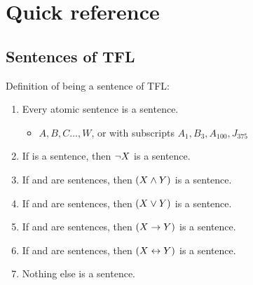 \chapter{Quick reference}\label{appendix:quickref}
\section{Sentences of TFL}
Definition of being a sentence of TFL:
	\begin{enumerate}
		\item Every atomic sentence is a sentence.
		\begin{itemize}
		\item $A,B,C\ldots,W$, or with subscripts $A_1, B_3, A_{100}, J_{375}$
		\end{itemize}
		\item If \metaX is a sentence, then $\neg X$ is a sentence.
		\item If \metaX and \metaY are sentences, then $(X\mathbin{\wedge}Y)$ is a sentence.
		\item If \metaX and \metaY are sentences, then $(X\vee Y)$ is a sentence.
		\item If \metaX and \metaY are sentences, then $(X\rightarrow Y)$ is a sentence.
		\item If \metaX and \metaY are sentences, then $(X\leftrightarrow Y)$ is a sentence.
		\item Nothing else is a sentence.
	\end{enumerate}
	
